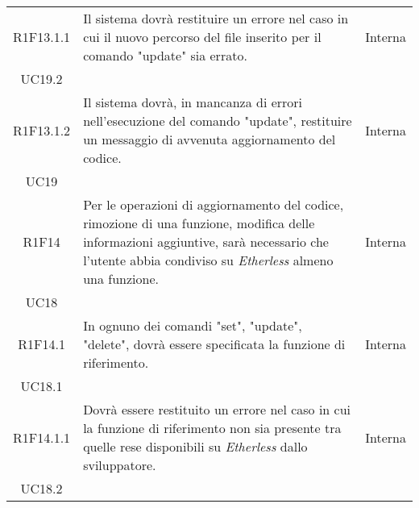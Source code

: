 \begin{longtable}{|c|p{8cm}|C{2cm}|}
	R1F13.1.1 & Il sistema dovrà restituire un errore nel caso in cui il nuovo percorso del file inserito per il comando "update" sia errato. & \centering Interna \\ UC19.2 \tabularnewline
	
	R1F13.1.2 & Il sistema dovrà, in mancanza di errori nell'esecuzione del comando "update", restituire un messaggio di avvenuta aggiornamento del codice. & \centering Interna \\ UC19 \tabularnewline
	
	R1F14 &  Per le operazioni di aggiornamento del codice, rimozione di una funzione, modifica delle informazioni aggiuntive, sarà necessario che l'utente abbia condiviso su \textit{Etherless} almeno una funzione. & \centering Interna \\ UC18 \tabularnewline
	
	R1F14.1 &  In ognuno dei comandi "set", "update", "delete", dovrà essere specificata la funzione di riferimento. & \centering Interna \\ UC18.1 \tabularnewline
	
	R1F14.1.1 &  Dovrà essere restituito un errore nel caso in cui la funzione di riferimento non sia presente tra quelle rese disponibili su \textit{Etherless} dallo sviluppatore. & \centering Interna \\ UC18.2 \tabularnewline
	\hline
	
\end{longtable}